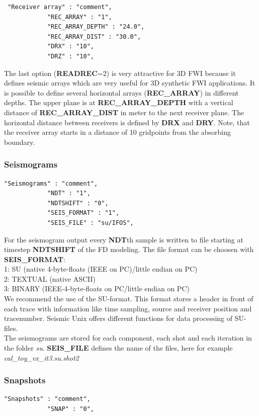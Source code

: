 \begin{verbatim}
 "Receiver array" : "comment",
			"REC_ARRAY" : "1",
			"REC_ARRAY_DEPTH" : "24.0",
			"REC_ARRAY_DIST" : "30.0",
			"DRX" : "10",
			"DRZ" : "10",
\end{verbatim}

The last option (\textbf{READREC}=2) is very attractive for 3D FWI because it defines seismic arrays which are very useful for 3D synthetic FWI applications. It is possible to define several horizontal arrays (\textbf{REC\_ARRAY}) in different depths. The upper plane is at \textbf{REC\_ARRAY\_DEPTH} with a vertical distance of \textbf{REC\_ARRAY\_DIST} in meter to the next receiver plane. The horizontal distance between receivers is defined by \textbf{DRX} and \textbf{DRY}. Note, that the receiver array starts in a distance of 10 gridpoints from the absorbing boundary.
\subsubsection*{Seismograms}
\begin{verbatim}
"Seismograms" : "comment",
			"NDT" : "1",
			"NDTSHIFT" : "0",
			"SEIS_FORMAT" : "1",
			"SEIS_FILE" : "su/IFOS",
\end{verbatim}

For the seismogram output every \textbf{NDT}th sample is written to file starting at timestep \textbf{NDTSHIFT} of the FD modeling. The file format can be choosen with \textbf{SEIS\_FORMAT}:\\
1: SU (native 4-byte-floats (IEEE on PC)/little endian on PC)\\
2: TEXTUAL (native ASCII)\\
3: BINARY (IEEE-4-byte-floats on PC/little endian on PC)\\
We recommend the use of the SU-format. This format stores a header in front of each trace with information like time sampling, source and receiver position and tracenumber. Seismic Unix offers different functions for data processing of SU-files.\\
The seismograms are stored for each component, each shot and each iteration in the folder \textit{su}. \textbf{SEIS\_FILE} defines the name of the files, here for example \textit{cal\_toy\_vx\_it3.su.shot2}
\subsubsection*{Snapshots}
\begin{verbatim}
"Snapshots" : "comment",
			"SNAP" : "0",
\end{verbatim}

